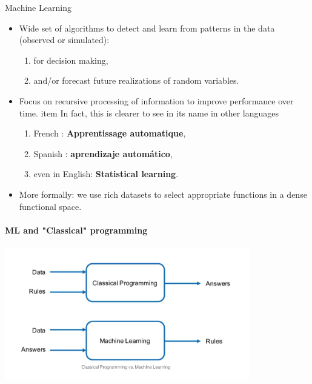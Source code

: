 \documentclass[notes, ignorenonframetext, compress, 10pt, xcolor=svgnames, aspectratio=169]{beamer}
\begin{document}
\begin{frame}[allowframebreaks]{Machine Learning}
\begin{itemize}
\item Wide set of algorithms to detect and learn from patterns in the data (observed or simulated):
\begin{enumerate}[$\cdot$]
\item for decision making,
\item and/or forecast future realizations of random variables.
\end{enumerate}
\item Focus on recursive processing of information to improve performance over time.
item In fact, this is clearer to see in its name in other languages
\begin{enumerate}[$\cdot$]
 \item French : \textbf{Apprentissage automatique},
\item  Spanish : \textbf{aprendizaje automático},
\item even in English: \textbf{Statistical learning}.
\end{enumerate}
\item More formally: we use rich datasets to select appropriate functions in a dense functional space.
\end{itemize}
\end{frame}
  
\begin{frame}[allowframebreaks]{\insertsection}
\framesubtitle{ML and "Classical" programming}

    \begin{center}
      \includegraphics[width=0.8\textwidth]{../../Ressources/Figs/Fig_ProgrammingAndMLconcepts.png}
      \end{center}
\end{frame}
\end{document}
